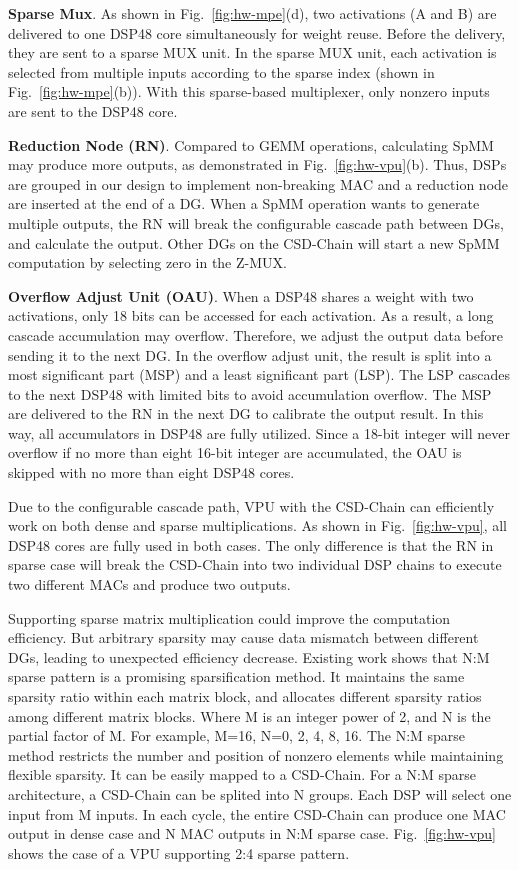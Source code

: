\textbf{Sparse Mux}. As shown in Fig.~\ref{fig:hw-mpe}(d), two activations (A and B) are delivered to one DSP48 core simultaneously for weight reuse. Before the delivery, they are sent to a sparse MUX unit. In the sparse MUX unit, each activation is selected from multiple inputs according to the sparse index (shown in Fig.~\ref{fig:hw-mpe}(b)). With this sparse-based multiplexer, only nonzero inputs are sent to the DSP48 core.

\textbf{Reduction Node (RN)}. Compared to GEMM operations, calculating SpMM may produce more outputs, as demonstrated in Fig.~\ref{fig:hw-vpu}(b). Thus, DSPs are grouped in our design to implement non-breaking MAC and a reduction node are inserted at the end of a DG. When a SpMM operation wants to generate multiple outputs, the RN will break the configurable cascade path between DGs, and calculate the output. Other DGs on the CSD-Chain will start a new SpMM computation by selecting zero in the Z-MUX.

\textbf{Overflow Adjust Unit (OAU)}. When a DSP48 shares a weight with two activations, only 18 bits can be accessed for each activation. As a result, a long cascade accumulation may overflow. Therefore, we adjust the output data before sending it to the next DG. In the overflow adjust unit, the result is split into a most significant part (MSP) and a least significant part (LSP). 
The LSP cascades to the next DSP48 with limited bits to avoid accumulation overflow. The MSP are delivered to the RN in the next DG to calibrate the output result. 
In this way, all accumulators in DSP48 are fully utilized. Since a 18-bit integer will never overflow if no more than eight 16-bit integer are accumulated, the OAU is skipped with no more than eight DSP48 cores.


Due to the configurable cascade path, VPU with the CSD-Chain can efficiently work on both dense and sparse multiplications. 
As shown in Fig.~\ref{fig:hw-vpu}, all DSP48 cores are fully used in both cases. The only difference is that the RN in sparse case will break the CSD-Chain into two individual DSP chains to execute two different MACs and produce two outputs.

Supporting sparse matrix multiplication could improve the computation efficiency. But arbitrary sparsity may cause data mismatch between different DGs, leading to unexpected efficiency decrease. 
Existing work shows that N:M sparse pattern is a promising sparsification method. It maintains the same sparsity ratio within each matrix block, and allocates different sparsity ratios among different matrix blocks. Where M is an integer power of 2, and N is the partial factor of M. For example, M=16, N=0, 2, 4, 8, 16. The N:M sparse method restricts the number and position of nonzero elements while maintaining flexible sparsity. It can be easily mapped to a CSD-Chain. For a N:M sparse architecture, a CSD-Chain can be splited into N groups. Each DSP will select one input from M inputs. In each cycle, the entire CSD-Chain can produce one MAC output in dense case and N MAC outputs in N:M sparse case. Fig.~\ref{fig:hw-vpu} shows the case of a VPU supporting 2:4 sparse pattern.

